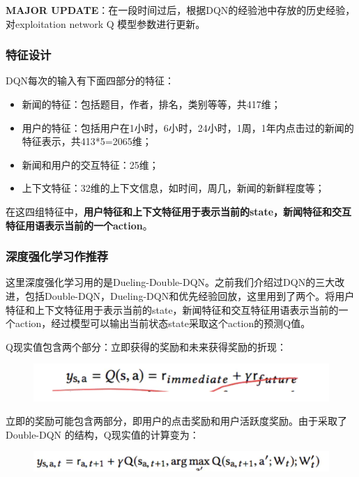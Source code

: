 \documentclass[12pt]{article}
\begin{document}
\textbf{MAJOR UPDATE}：在一段时间过后，根据DQN的经验池中存放的历史经验，对exploitation network Q 模型参数进行更新。

\subsubsection{特征设计}
DQN每次的输入有下面四部分的特征：
\begin{itemize}
\setlength{\itemsep}{0pt}
\setlength{\parsep}{0pt}
\setlength{\parskip}{0pt}
    \item 新闻的特征：包括题目，作者，排名，类别等等，共417维；
    \item 用户的特征：包括用户在1小时，6小时，24小时，1周，1年内点击过的新闻的特征表示，共413*5=2065维；
    \item 新闻和用户的交互特征：25维；
    \item 上下文特征：32维的上下文信息，如时间，周几，新闻的新鲜程度等；
\end{itemize}

在这四组特征中，\textbf{用户特征和上下文特征用于表示当前的state，新闻特征和交互特征用语表示当前的一个action}。

\subsubsection{深度强化学习作推荐}
这里深度强化学习用的是Dueling-Double-DQN。之前我们介绍过DQN的三大改进，包括Double-DQN，Dueling-DQN和优先经验回放，这里用到了两个。将用户特征和上下文特征用于表示当前的state，新闻特征和交互特征用语表示当前的一个action，经过模型可以输出当前状态state采取这个action的预测Q值。

Q现实值包含两个部分：立即获得的奖励和未来获得奖励的折现：
\begin{figure}[H]
    \centering
    \includegraphics[width=1\textwidth]{fig/DRN_Q_Value.png}
\end{figure}

立即的奖励可能包含两部分，即用户的点击奖励和用户活跃度奖励。由于采取了Double-DQN 的结构，Q现实值的计算变为：
\begin{figure}[H]
    \centering
    \includegraphics[width=1\textwidth]{fig/DRN_Q_Value_Immediate.png}
\end{figure}
\end{document}
